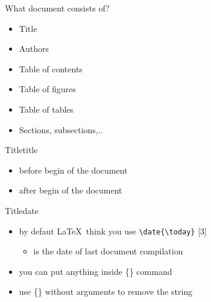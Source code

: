 \graphicspath{{sec01/images/s1z/}{sec01/code/s1/}}
\lstset{inputpath=sec01/code/s1/}

\begin{frame}{What document consists of?}\relax
\begin{itemize}
    \item Title
    \item Authors
    \item Table of contents
    \item Table of figures
    \item Table of tables
    \item Sections, subsections,..
\end{itemize}
     
\end{frame}

\begin{frame}[fragile]{Title}{title}\relax
\cprotect{}
\inpause
\begin{itemize}
     \item \ccol{\title} before begin of the document
     \item \ccol{\maketitle} after begin of the document 
\end{itemize}
\end{frame}

\begin{frame}[fragile]{Title}{date}
 \cprotect{}
\inpause
\begin{itemize}
     \item by defaut \LaTeX\ think you use {\csk \verb|\date{\today}|}
     [3]
     \begin{itemize}
         \item \ccol{\today} is the date of last document compilation
     \end{itemize} 
     \inpause
     \item you can put anything inside \ccol{\date}\{\} command
     \item use \ccol{\date}\{\} without arguments to remove the string
\end{itemize}
\inpause
{}
\end{frame}

